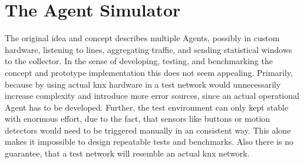 \section{The Agent Simulator}
\label{sec:impl:agent}

\begin{comment}
\begin{itemize}
	\item simulates multiple agents based of one log containing telegram in raw \gls{baos} format. cf. Appendix~\todo{add log sample in appendix}
	\item log must be in chronological order
	\item utilizes own parser implementation \url{https://github.com/FreakyBytes/BaosKnxParser}
	\item different agents can be simulated by applying filter rules to log stream, defining, what each agent "can see"
	\item is supposed to replace actual agents during development
		\subitem repeatable data
		\subitem easy/fast setup
		\subitem log-time much faster than real-time
		\subitem load testing possible
	\item reads in individual pack
	\item filters according to agent filter rules
	\item updates agent-specific window data model
	\item if window length/timeout (cf. Section~\ref{sec:concept:agent}) is exceeded in log-time, windows are submitted to \gls{amqp} message broker (cf. Figure~\ref{fig:concept:architecture})
	\item runs until log is fully red, or maximum packets to parse are exceeded, or defined end timestamp is reached
\end{itemize}
\end{comment}

The original idea and concept describes multiple Agents, possibly in custom hardware, listening to lines, aggregating traffic, and sending statistical windows to the collector.
In the sense of developing, testing, and benchmarking the concept and prototype implementation this does not seem appealing. Primarily, because by using actual \gls{knx} hardware in a test network would unnecessarily increase complexity and introduce more error sources, since an actual operational Agent has to be developed.
Further, the test environment can only kept stable with enormous effort, due to the fact, that sensors like buttons or motion detectors would need to be triggered manually in an consistent way. This alone makes it impossible to design repeatable tests and benchmarks.
Also there is no guarantee, that a test network will resemble an actual \gls{knx} network.

